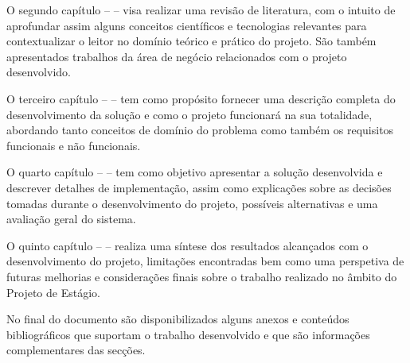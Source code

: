 O segundo capítulo –  – visa realizar uma revisão de literatura, com o intuito de 
aprofundar assim alguns conceitos científicos e tecnologias relevantes para contextualizar o leitor no domínio 
teórico e prático do projeto. São também apresentados trabalhos da área de negócio relacionados com o projeto desenvolvido.

O terceiro capítulo –  – tem como propósito fornecer uma
descrição completa do desenvolvimento da solução e como o projeto funcionará na sua
totalidade, abordando tanto conceitos de domínio do problema como também os requisitos
funcionais e não funcionais.

O quarto capítulo –  – tem como objetivo apresentar a solução desenvolvida
e descrever detalhes de implementação, assim como explicações sobre as decisões tomadas durante o
desenvolvimento do projeto, possíveis alternativas e uma avaliação geral do sistema.

O quinto capítulo –  – realiza uma síntese dos resultados alcançados com o
desenvolvimento do projeto, limitações encontradas bem como uma perspetiva de futuras melhorias e considerações 
finais sobre o trabalho realizado no âmbito do Projeto de Estágio.

No final do documento são disponibilizados alguns anexos e conteúdos bibliográficos que suportam o trabalho
desenvolvido e que são informações complementares das secções.

